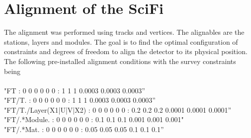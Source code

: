 \chapter{Alignment of the SciFi}
\label{sec:story}




The alignment was performed using tracks and vertices. The alignables are the stations,
layers and modules.
The goal is to find the optimal configuration of constraints and degrees of freedom to align the detector to its physical position.
The following pre-installed alignment conditions with the survey constraints being\\
\\
"FT : 0 0 0 0 0 0 : 1 1 1 0.0003 0.0003 0.0003”\\
"FT/T. : 0 0 0 0 0 0 : 1 1 1 0.0003 0.0003 0.0003”\\
"FT/T./Layer(X1|U|V|X2) : 0 0 0 0 0 0 : 0.2 0.2 0.2 0.0001 0.0001 0.0001”\\
"FT/.*Module. : 0 0 0 0 0 0 : 0.1 0.1 0.1 0.001 0.001 0.001"\\
"FT/.*Mat. : 0 0 0 0 0 0 : 0.05 0.05 0.05 0.1 0.1 0.1”\\

